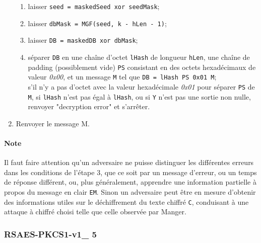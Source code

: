 \begin{enumerate}
\begin{enumerate}
      	\item laisser \texttt{seed = maskedSeed xor seedMask};
      	\item laisser \texttt{dbMask = MGF(seed, k - hLen - 1)};
      	\item laisser \texttt{DB = maskedDB xor dbMask};
      	\item séparer \texttt{DB} en une chaîne d'octet \texttt{lHash} de longueur \texttt{hLen}, une chaîne de padding (possiblement vide) \texttt{PS} consistant en des octets hexadécimaux de valeur \textit{0x00}, et un message \texttt{M} tel que \texttt{DB = lHash \textbar\textbar PS \textbar\textbar 0x01 \textbar\textbar M};
		 \\ s'il n'y a pas d'octet avec la valeur hexadécimale \textit{0x01} pour séparer \texttt{PS} de \texttt{M}, si \texttt{lHash} n'est pas égal à \texttt{lHash}, ou si \texttt{Y} n'est pas une sortie non nulle, renvoyer "decryption error" et s'arrêter.\\
	\end{enumerate}
	\item Renvoyer le message M.\\
\end{enumerate}
\paragraph{Note}  Il faut faire attention qu'un adversaire ne puisse distinguer les différentes erreurs dans les conditions de l'étape 3, que ce soit par un message d'erreur, ou un temps de réponse différent, ou, plus généralement, apprendre une information partielle à propos du message en clair \texttt{EM}. Sinon un adversaire peut être en mesure d'obtenir des informations utiles sur le déchiffrement du texte chiffré \texttt{C}, conduisant à une attaque à chiffré choisi telle que celle observée par Manger.
   
\subsubsection{RSAES-PKCS1-v1\_ 5}

